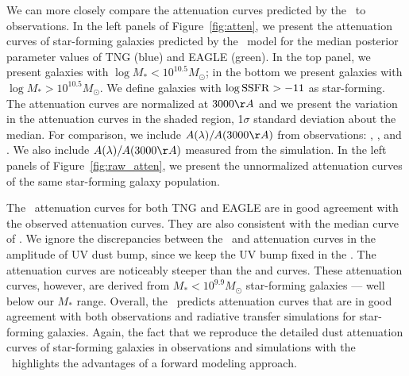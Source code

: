 We can more closely compare the attenuation curves predicted by the \eda~to 
observations. In the left panels of Figure~\ref{fig:atten}, we present the 
attenuation curves of star-forming galaxies predicted by the \eda~model for 
the median posterior parameter values of TNG (blue) and EAGLE (green). In 
the top panel, we present galaxies with $\log M_* < 10^{10.5} M_\odot$; in 
the bottom we present galaxies with $\log M_* > 10^{10.5} M_\odot$. We define
galaxies with $\log {\rm SSFR} > -11$ as star-forming. The attenuation curves 
are normalized at
$3000\AA$ and we present the variation in the attenuation curves in the shaded
region, 1$\sigma$ standard deviation about the median. For comparison,
we include $A(\lambda)/A(3000\AA)$ from observations: \cite{calzetti2000},
\cite{battisti2017}, and \cite{salim2018}. We also include $A(\lambda)/A(3000\AA)$
measured from the \cite{narayanan2018} simulation. In the left panels of 
Figure~\ref{fig:raw_atten}, we present the unnormalized attenuation curves of
the same star-forming galaxy population. 

The \eda~attenuation curves for both TNG and EAGLE are in good agreement with the
observed \cite{salim2018} attenuation curves. They are also consistent with the
median curve of \cite{narayanan2018}. We ignore the discrepancies between the
\eda~and \cite{narayanan2018} attenuation curves in the amplitude of UV dust
bump, since we keep the UV bump fixed in the \eda. The \eda attenuation curves 
are noticeably steeper than the \cite{calzetti2000} and \cite{battisti2017} curves. 
These attenuation curves, however, are derived from $M_* < 10^{9.9}M_\odot$ 
star-forming galaxies --- well below our $M_*$ range. %
Overall, the \eda~predicts attenuation curves that are in good agreement with 
both observations and radiative transfer simulations for star-forming galaxies. 
Again, the fact that we reproduce the detailed dust attenuation curves of star-forming 
galaxies in observations and simulations with the \eda~highlights the
advantages of a forward modeling approach. 

